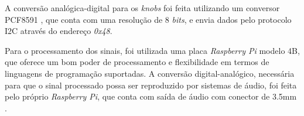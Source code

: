 
A conversão analógica-digital para os \textit{knobs} foi feita %
utilizando um conversor PCF8591 \cite{saravaticomponentes}, %
que conta com uma resolução de 8 \textit{bits}, e envia dados pelo protocolo I2C 
através do endereço \textit{0x48}.






Para o processamento dos sinais, foi utilizada uma placa \textit{Raspberry Pi} modelo 4B, que oferece um bom poder de processamento e flexibilidade em termos de linguagens de programação suportadas.
A conversão digital-analógico, necessária para que o sinal processado possa ser reproduzido por sistemas de áudio, foi feita pelo próprio \textit{Raspberry Pi}, que conta com saída de áudio com conector de 3.5mm  \cite{adrenalineDisplaysLanar}.

